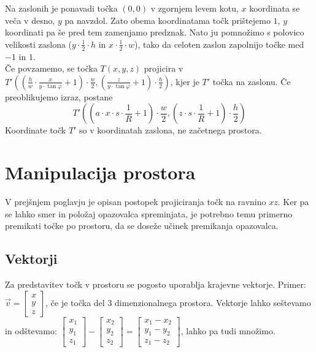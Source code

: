 \documentclass[a4paper, 12px]{article}
\begin{document}
    Na zaslonih je ponavadi točka $\left(0, 0\right)$ v zgornjem levem kotu, $x$ koordinata se veča v desno, $y$ pa navzdol.
    Zato obema koordinatama točk prištejemo $1$, $y$ koordinati pa še pred tem zamenjamo predznak.
    Nato ju pomnožimo s polovico velikosti zaslona ($y \cdot \frac{1}{2} \cdot h$ in $x \cdot \frac{1}{2} \cdot w$), tako da celoten zaslon zapolnijo točke med $-1$ in $1$. \\

    Če povzamemo, se točka $T\left(x, y, z\right)$ projicira v 
    $T'\left(\left(\frac{h}{w} \cdot \frac{x}{y \cdot \tan{\varphi}} + 1\right) \cdot \frac{w}{2},
    \left(\frac{z}{y \cdot \tan{\varphi}} + 1\right) \cdot \frac{h}{2} \right)$, 
    kjer je $T'$ točka na zaslonu. Če preoblikujemo izraz, postane 
    $$T'\left(\left(a \cdot x \cdot s \cdot \frac{1}{R} + 1\right) \cdot \frac{w}{2},
    \left(z \cdot s \cdot \frac{1}{R} + 1\right) \cdot \frac{h}{2} \right)$$
    Koordinate točk $T'$ so v koordinatah zaslona, ne začetnega prostora.
    \cite{ProjectionVideo}

\section{Manipulacija prostora}
    V prejšnjem poglavju je opisan postopek projiciranja točk na ravnino $xz$.
    Ker pa se lahko smer in položaj opazovalca spreminjata, je potrebno temu primerno premikati
    točke po prostoru, da se doseže učinek premikanja opazovalca.
\subsection{Vektorji}
    Za predstavitev točk v prostoru se pogosto uporablja krajevne vektorje. Primer:
    $\vec{v}=\begin{bmatrix}
        x \\ y \\ z
    \end{bmatrix}$, če je točka del 3 dimenzionalnega prostora. Vektorje lahko seštevamo in odštevamo:
    $\begin{bmatrix}
        x_1 \\ y_1 \\ z_1
    \end{bmatrix} - \begin{bmatrix}
        x_2 \\ y_2 \\ z_2
    \end{bmatrix} = \begin{bmatrix}
        x_1 - x_2 \\ y_1 - y_2 \\ z_1 - z_2
    \end{bmatrix}$, lahko pa tudi množimo. \\
\end{document}
